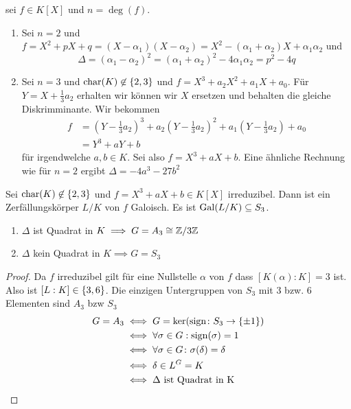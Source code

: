 \begin{Bem}
    sei \(f\in K[X]\) und \(n=\deg(f)\).
    \begin{enumerate}
        \item Sei \(n=2\) und \(f=X^2+pX+q=(X-\alpha_1)(X-\alpha_2)=X^2-(\alpha_1+\alpha_2)X+\alpha_1\alpha_2\)
        und \[\Delta=(\alpha_1-\alpha_2)^2=(\alpha_1+\alpha_2)^2-4\alpha_1\alpha_2=p^2-4q\]
        \item Sei \(n=3\) und \(\operatorname{char} (K)\not\in\{2,3\}\) und \(f=X^3+a_2X^2+a_1X+a_0\). Für \(Y=X+\frac{1}{3}a_2\) erhalten wir können wir \(X\) ersetzen und behalten die gleiche Diskrimminante. Wir bekommen
        \begin{align*}
            f&=(Y-\frac{1}{3}a_2)^3+a_2(Y-\frac 13 a_2)^2+a_1(Y-\frac 1 3a_2)+a_0\\
            &=Y^3+aY+b
        \end{align*} für irgendwelche \(a,b\in K\). Sei also \(f=X^3+aX+b\). Eine ähnliche 
        Rechnung wie für \(n=2\) ergibt \(\Delta=-4a^3-27b^2\)
    \end{enumerate}
\end{Bem}
\begin{Satz}
    Sei \(\operatorname{char} (K)\not\in\{2,3\}\) und \(f=X^3+aX+b\in K[X]\) irreduzibel. Dann ist ein Zerfällungskörper \(L/K\) von \(f\) Galoisch. Es ist \(\operatorname{Gal}(L/K)\subseteq S_3\).
    \begin{enumerate}
        \item \(\Delta\) ist Quadrat in \(K\implies G=A_3\cong\mathbb{Z}/3\mathbb{Z}\)
        \item \(\Delta\) kein Quadrat in \(K\implies G=S_3\)
    \end{enumerate}
\end{Satz}
\begin{proof}
    Da \(f\) irreduzibel gilt für eine Nullstelle \(\alpha\) von \(f\) dass \([K(\alpha):K]=3\) ist. Also ist \([L:K]\in\{3,6\}\).
    Die einzigen Untergruppen von \(S_3\) mit 3 bzw. 6 Elementen sind \(A_3\) bzw \(S_3\)
    \begin{align*}
        G=A_3&\iff G=\ker(\operatorname{sign}\colon S_3\to\{\pm 1\})\\
        &\iff \forall\sigma\in G: \operatorname{sign}(\sigma)=1\\
        &\iff \forall \sigma\in G\colon \sigma(\delta)=\delta\\
        &\iff \delta\in L^G=K\\
        &\iff \Delta \text{ ist Quadrat in K}
    \end{align*}
\end{proof}

